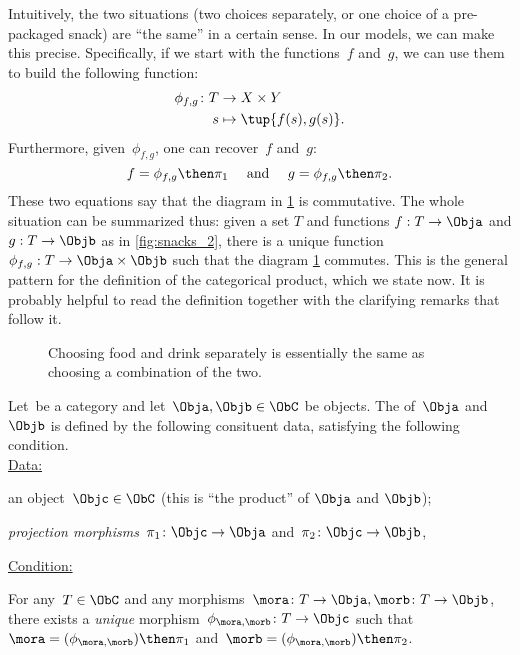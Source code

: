 Intuitively, the two situations (two choices separately, or one choice of a pre-packaged snack) are ``the same'' in a certain sense. In our models, we can make this precise. Specifically, if we start with the functions~$f$ and~$g$, we can use them to build the following function:
\begin{equation*}
    \begin{aligned}
        \phi_{f,g}\colon T&\to X\times Y\\
        s&\mapsto \tup{f(s),g(s)}.
    \end{aligned}
\end{equation*}
Furthermore, given~$\phi_{f,g}$, one can recover~$f$ and~$g$:
\begin{equation*}
    f=\phi_{f,g}\then \pi_1 \quad  \text{ and } \quad g=\phi_{f,g}\then \pi_2.
\end{equation*}
These two equations say that the diagram in \cref{fig:snacks_3} is commutative. The whole situation can be summarized thus: given a set $T$ and functions $f: T \rightarrow \Obja$ and $g: T \rightarrow \Objb$ as in \cref{fig:snacks_2}, there is a unique function $\phi_{f,g} : T \rightarrow \Obja \times \Objb$ such that the diagram \cref{fig:snacks_3} commutes. This is the general pattern for the definition of the categorical product, which we state now. It is probably helpful to read the definition together with the clarifying remarks that follow it.



\begin{figure}[h!]
    \begin{center}
    \end{center}
    \caption{Choosing food and drink separately is essentially the same as choosing a combination of the two. \label{fig:snacks_3}}
\end{figure}






\begin{ctdefinition}
    Let~\CatC be a category and let~$\Obja, \Objb \in \ObC$ be objects. The \emph{} of~$\Obja$ and~$\Objb$ is defined by the following consituent data, satisfying the following condition. \\
    \underline{Data:}
    \begin{compactenum}
        \item an object~$\Objc \in \ObC$ (this is ``the product'' of $\Obja$  and $\Objb$);
        \item \emph{projection morphisms}~$\pi_1 \colon \Objc \to \Obja$ and~$\pi_2 \colon \Objc \to \Objb$,
    \end{compactenum}
    \underline{Condition:}
    \begin{compactenum}
        \item For any~$T \in \ObC$ and any morphisms~$\mora \colon T \to \Obja, \morb \colon T \to \Objb$, there exists a \emph{unique} morphism~$\phi_{\mora,\morb} \colon T \to \Objc$ such that~$\mora = (\phi_{\mora,
            \morb})\then \pi_1$ and~$\morb=(\phi_{\mora, \morb})\then \pi_2$.
    \end{compactenum}
\end{ctdefinition}

